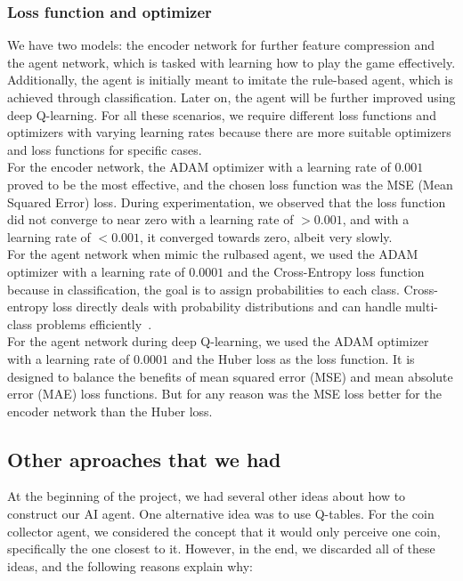 \subsubsection*{Loss function and optimizer}

We have two models: the encoder network for further feature compression and the agent network, which is tasked with 
learning how to play the game effectively. Additionally, the agent is initially meant to imitate the rule-based agent, which is 
achieved through classification. Later on, the agent will be further improved using deep Q-learning. For all these scenarios, we require 
different loss functions and optimizers with varying learning rates because there are more suitable optimizers and loss functions for specific cases.\\

For the encoder network, the ADAM optimizer with a learning rate of $0.001$ proved to be the most effective, and the chosen loss 
function was the MSE (Mean Squared Error) loss. During experimentation, we observed that the loss function did not converge to near 
zero with a learning rate of $>0.001$, and with a learning rate of $<0.001$, it converged towards zero, albeit very slowly. \\

For the agent network when mimic the rulbased agent, we used the ADAM optimizer with a learning rate of $0.0001$ and the Cross-Entropy loss function because
in classification, the goal is to assign probabilities to each class. Cross-entropy loss directly deals with probability 
distributions and can handle multi-class problems efficiently~\cite{Onl:crossentr}.\\

For the agent network during deep Q-learning, we used the ADAM optimizer with a learning rate of $0.0001$ and the Huber loss as the loss function.
It is designed to balance the benefits of mean squared error (MSE) and mean absolute error (MAE) loss functions.
But for any reason was the MSE loss better for the encoder network than the Huber loss.

\subsection{Other aproaches that we had}

At the beginning of the project, we had several other ideas about how to construct our AI agent. One alternative idea was to use Q-tables. 
For the coin collector agent, we considered the concept that it would only perceive one coin, specifically the one closest to it.
However, in the end, we discarded all of these ideas, and the following reasons explain why:

